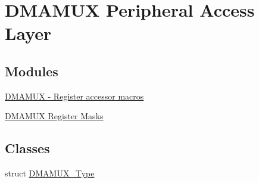 \hypertarget{group__DMAMUX__Peripheral__Access__Layer}{}\section{D\+M\+A\+M\+UX Peripheral Access Layer}
\label{group__DMAMUX__Peripheral__Access__Layer}
\subsection*{Modules}
\begin{DoxyCompactItemize}
\item 
\hyperlink{group__DMAMUX__Register__Accessor__Macros}{D\+M\+A\+M\+U\+X -\/ Register accessor macros}
\item 
\hyperlink{group__DMAMUX__Register__Masks}{D\+M\+A\+M\+U\+X Register Masks}
\end{DoxyCompactItemize}
\subsection*{Classes}
\begin{DoxyCompactItemize}
\item 
struct \hyperlink{structDMAMUX__Type}{D\+M\+A\+M\+U\+X\+\_\+\+Type}
\end{DoxyCompactItemize}
